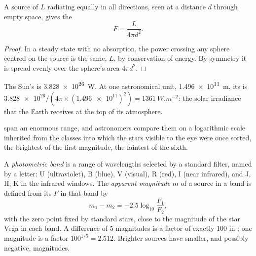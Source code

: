 \begin{proposition}\label{prop:b1:observing-the-sky:inverse-square}
A source of  $L$ radiating equally in all directions, seen at a
distance $d$ through empty space, gives the 
\[
  F = \frac{L}{4\pi d^2} .
\]
\end{proposition}

\begin{proof}
In a steady state with no absorption, the power crossing any sphere centred
on the source is the same, $L$, by conservation of energy. By symmetry it is
spread evenly over the sphere's area $4\pi d^2$.
\end{proof}

\begin{example}
The Sun's  is \qty{3.828e26}{W}. At one astronomical unit,
\qty{1.496e11}{m}, its  is $\num{3.828e26}/(4\pi\times
(\num{1.496e11})^2) = \qty{1361}{W.m^{-2}}$: the solar irradiance that the
Earth receives at the top of its atmosphere.
\end{example}

 span an enormous range, and astronomers compare them on a
logarithmic scale inherited from the classes into which the stars visible
to the eye were once sorted, the brightest of the first magnitude, the
faintest of the sixth.

\begin{definition}\label{def:b1:observing-the-sky:magnitude}
A \emph{photometric band} is a range of wavelengths
selected by a standard filter, named by a letter: U (ultraviolet), B (blue),
V (visual), R (red), I (near infrared), and J, H, K in the infrared windows.
The \emph{apparent magnitude} $m$ of a source in a
band is defined from its  $F$ in that band by
\[
  m_1 - m_2 = -2.5\log_{10}\frac{F_1}{F_2} ,
\]
with the zero point fixed by standard stars, close to the magnitude of the
star Vega in each band. A difference of 5 magnitudes is a factor of exactly
100 in ; one magnitude is a factor $100^{1/5} = 2.512$. Brighter
sources have smaller, and possibly negative, magnitudes.
\end{definition}


